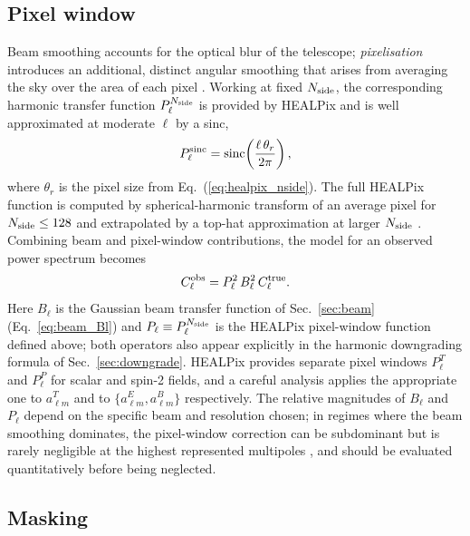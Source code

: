 \documentclass[11pt]{article}
\theoremstyle{definition}
\begin{document}
\subsection{Pixel window}
\label{sec:pixwin}

Beam smoothing accounts for the optical blur of the telescope; \emph{pixelisation} introduces an additional, distinct angular smoothing that arises from averaging the sky over the area of each pixel \cite{sullivan2024methods}. Working at fixed \(N_{\rm side}\), the corresponding harmonic transfer function \(P_\ell^{N_{\rm side}}\) is provided by HEALPix \cite{gorski2005} and is well approximated at moderate \(\ell\) by a sinc,
\begin{equation}
  P_\ell^{\rm sinc}
  = \mathrm{sinc}\!\left(\frac{\ell\,\theta_r}{2\pi}\right),
\end{equation}
where \(\theta_r\) is the pixel size from Eq.~(\ref{eq:healpix_nside}). The full HEALPix function is computed by spherical-harmonic transform of an average pixel for \(N_{\rm side}\leq 128\) and extrapolated by a top-hat approximation at larger \(N_{\rm side}\) \cite{gorski2005}. Combining beam and pixel-window contributions, the model for an observed power spectrum becomes
\begin{equation}
  C_\ell^{\rm obs}
  = P_\ell^2\,B_\ell^2\,C_\ell^{\rm true}.
  \label{eq:obs_spectrum}
\end{equation}
Here $B_\ell$ is the Gaussian beam transfer function of Sec.~\ref{sec:beam} (Eq.~\ref{eq:beam_Bl}) and $P_\ell \equiv P_\ell^{N_{\rm side}}$ is the HEALPix pixel-window function defined above; both operators also appear explicitly in the harmonic downgrading formula of Sec.~\ref{sec:downgrade}. HEALPix \cite{gorski2005} provides separate pixel windows $P_\ell^T$ and $P_\ell^P$ for scalar and spin-2 fields, and a careful analysis applies the appropriate one to $a_{\ell m}^T$ and to $\{a_{\ell m}^E,a_{\ell m}^B\}$ respectively. The relative magnitudes of $B_\ell$ and $P_\ell$ depend on the specific beam and resolution chosen; in regimes where the beam smoothing dominates, the pixel-window correction can be subdominant but is rarely negligible at the highest represented multipoles \cite{sullivan2024methods}, and should be evaluated quantitatively before being neglected.

\subsection{Masking}
\label{sec:masking}
\end{document}
